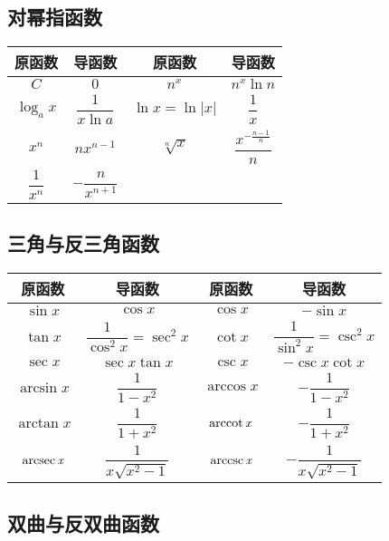 \documentclass[UTF8, 12pt]{ctexart}
\begin{document}
\subsection{对幂指函数}

\begin{center}
    \begin{tabular}{|c|c|c|c|}
        \hline
        原函数 & 导函数 & 原函数 & 导函数\\ \hline
        $C$ & $0$ & $n^x$ & $n^x\ln n$ \\ \hline
        $\log_ax$ & $\dfrac{1}{x\ln a}$ & $\ln x=\ln\vert x\vert$ & $\dfrac{1}{x}$ \\ \hline
        $x^n$ & $nx^{n-1}$ & $\sqrt[n]{x}$ & $\dfrac{x^{-\frac{n-1}{n}}}{n}$ \\ \hline
        $\dfrac{1}{x^n}$ & $-\dfrac{n}{x^{n+1}}$ & & \\ 
        \hline
    \end{tabular}
\end{center}

\subsection{三角与反三角函数}

\begin{center}
    \begin{tabular}{|c|c|c|c|}
        \hline
        原函数 & 导函数 & 原函数 & 导函数\\ \hline
        $\sin x$ & $\cos x$ & $\cos x$ & $-\sin x$ \\ \hline
        $\tan x$ & $\dfrac{1}{\cos^2x}=\sec^2x$ & $\cot x$ & $\dfrac{1}{\sin^2x}=\csc^2x$ \\ \hline
        $\sec x$ & $\sec x\tan x$ & $\csc x$ & $-\csc x\cot x$ \\ \hline
        $\arcsin x$ & $\dfrac{1}{1-x^2}$ & $\arccos x$ & $-\dfrac{1}{1-x^2}$ \\ \hline
        $\arctan x$ & $\dfrac{1}{1+x^2}$ & $\rm{arccot}\,\textit{x}$ & $-\dfrac{1}{1+x^2}$ \\ \hline
        $\rm{arcsec}\,\textit{x}$ & $\dfrac{1}{x\sqrt{x^2-1}}$ & $\rm{arccsc}\,\textit{x}$ & $-\dfrac{1}{x\sqrt{x^2-1}}$ \\ \hline
        \hline
    \end{tabular}
\end{center}

\subsection{双曲与反双曲函数}
\end{document}
